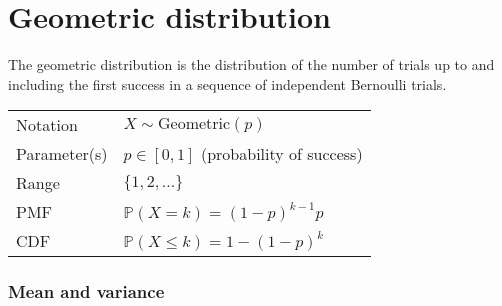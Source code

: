 \documentclass[lecture]{csm}
\newcommand{\prob}{\mathbb{P}}
\newcommand{\R}{\mathbb{R}}
\def\it{\item}
\def\bit{\begin{itemize}}
\def\eit{\end{itemize}}
\begin{document}
\maketitle
\tableofcontents

   
\newpage
\section{Geometric distribution}
The geometric distribution is the distribution of the number of trials up to and including the first success in a sequence of independent Bernoulli trials. 

\begin{center}
\begin{tabular}{ll}\hline
Notation			& $X\sim\text{Geometric}(p)$ \\
Parameter(s)		& $p \in[0,1]$ \quad (probability of success) \\
Range			& $\{1,2,\ldots\}$ \\
PMF				& $\prob(X=k) = (1-p)^{k-1} p$\\ 
CDF				& $\prob(X\leq k) = 1-(1-p)^k$\\ \hline
\end{tabular}
\end{center}

\subsubsection*{Mean and variance}
\end{document}
